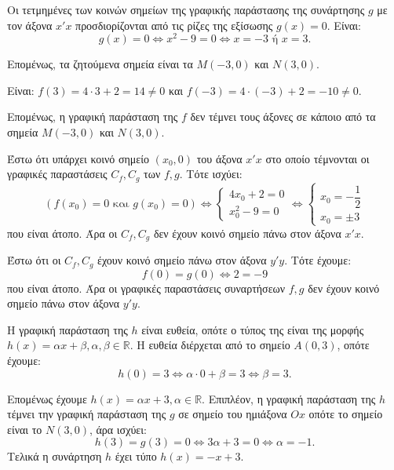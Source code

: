 
\begin{alist}
\item Οι τετμημένες των κοινών σημείων της γραφικής παράστασης της συνάρτησης $g$ με τον
άξονα $x'x$ προσδιορίζονται από τις ρίζες της εξίσωσης $g(x) = 0$. Είναι:
\[g(x) = 0 \Leftrightarrow x^2 - 9 = 0 \Leftrightarrow x = -3 \text{ ή } x = 3.\]

Επομένως, τα ζητούμενα σημεία είναι τα $M(-3, 0)$ και $N(3, 0)$.

\item Είναι:
$f(3) = 4 \cdot 3 + 2 = 14 \ne 0$ και $f(-3) = 4 \cdot (-3) + 2 = -10 \ne 0$.

Επομένως, η γραφική παράσταση της $f$ δεν τέμνει τους άξονες σε κάποιο από τα σημεία $M(-3, 0)$ και $N(3, 0)$.

\item Έστω ότι υπάρχει κοινό σημείο $(x_0, 0)$ του άξονα $x'x$ στο οποίο τέμνονται οι γραφικές
παραστάσεις $C_f, C_g$ των $f, g$. Τότε ισχύει:
\[(f(x_0) = 0 \text{ και } g(x_0) = 0) \Leftrightarrow \begin{cases} 4x_0 + 2 = 0 \\ x_0^2 - 9 = 0 \end{cases} \Leftrightarrow \begin{cases} x_0 = -\dfrac{1}{2} \\ x_0 = \pm 3 \end{cases}\]
που είναι άτοπο. Άρα οι $C_f, C_g$ δεν έχουν κοινό σημείο πάνω στον άξονα $x'x$.

Έστω ότι οι $C_f, C_g$ έχουν κοινό σημείο πάνω στον άξονα $y'y$. Τότε έχουμε:
\[f(0) = g(0) \Leftrightarrow 2 = -9\]
που είναι άτοπο. Άρα οι γραφικές παραστάσεις συναρτήσεων $f, g$ δεν έχουν κοινό σημείο πάνω στον άξονα $y'y$.

\item Η γραφική παράσταση της $h$ είναι ευθεία, οπότε ο τύπος της είναι της μορφής
$h(x) = \alpha x + \beta, \alpha, \beta \in \mathbb{R}$. Η ευθεία διέρχεται από το σημείο $A(0, 3)$, οπότε έχουμε:
\[h(0) = 3 \Leftrightarrow \alpha \cdot 0 + \beta = 3 \Leftrightarrow \beta = 3.\]

Επομένως έχουμε $h(x) = \alpha x + 3, \alpha \in \mathbb{R}$. Επιπλέον, η γραφική παράσταση της $h$ τέμνει την γραφική παράσταση της $g$ σε σημείο του ημιάξονα $Ox$ οπότε το σημείο είναι το $N(3,0)$, άρα ισχύει:
\[h(3) = g(3) = 0 \Leftrightarrow 3\alpha + 3 = 0 \Leftrightarrow \alpha = -1.\]
Τελικά η συνάρτηση $h$ έχει τύπο $h(x) = -x + 3$.
\end{alist}


